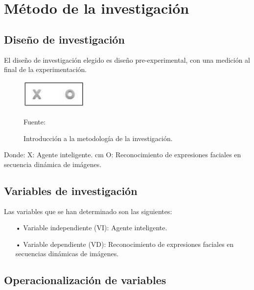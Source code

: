 \section{Método de la investigación}

\subsection{Diseño de investigación}
El diseño de investigación elegido es diseño pre-experimental, con una medición al final de la experimentación.

\begin{figure}[ht]
\begin{center}
\includegraphics[width=0.3\textwidth]{Imagen1}
\end{center}
\begin{center}
\vskip -0.5cm
\caption{\small{Introducción a la metodología de la investigación.}}
{\small{Fuente: \cite{Bernal}}}
\end{center}
\end{figure}

Donde: \vskip 0.1cm
X: Agente inteligente.  cm
O: Reconocimiento de expresiones faciales en secuencia dinámica de imágenes.

\subsection{Variables de investigación}

Las variables que se han determinado son las siguientes:

\begin{itemize}
\item[•] Variable independiente (VI): Agente inteligente.
\item[•] Variable dependiente (VD): Reconocimiento de expresiones faciales en secuencias dinámicas de imágenes.
\end{itemize}

\vskip 4.65cm

\subsection{Operacionalización de variables}

